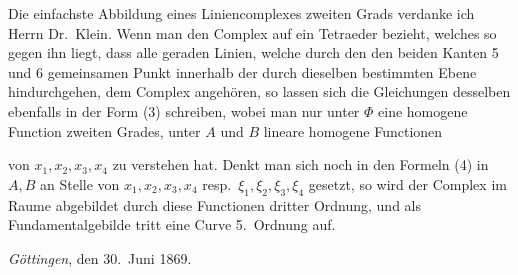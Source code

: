 \documentclass{article}
\begin{document}
Die einfachste Abbildung eines Liniencomplexes zweiten Grads verdanke ich Herrn Dr.\ Klein. Wenn man den Complex auf ein Tetraeder bezieht, welches so gegen ihn liegt, dass alle geraden Linien, welche durch den den beiden Kanten 5 und 6 gemeinsamen Punkt innerhalb der durch dieselben bestimmten Ebene hindurchgehen, dem Complex angehören, so lassen sich die Gleichungen desselben ebenfalls in der Form (3) schreiben, wobei man nur unter $\Phi$ eine homogene Function zweiten Grades, unter $A$ und $B$ lineare homogene Functionen

von $x_1, x_2, x_3, x_4$ zu verstehen hat. Denkt man sich noch in den Formeln (4) in $A, B$ an Stelle von $x_1, x_2, x_3, x_4$ resp.\ $\xi_1, \xi_2, \xi_3, \xi_4$ gesetzt, so wird der Complex im Raume abgebildet durch diese Functionen dritter Ordnung, und als Fundamentalgebilde tritt eine Curve 5.\ Ordnung auf.

\emph{Göttingen}, den 30.\ Juni 1869.
\end{document}
